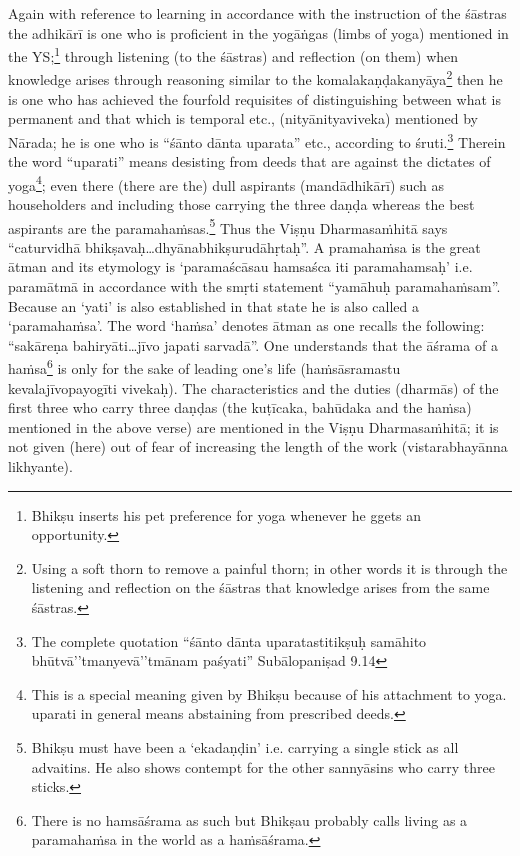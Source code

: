 Again with reference to learning in accordance with the instruction of the śāstras the adhikārī is one who is proficient in the yogāṅgas (limbs of yoga) mentioned in the YS;\footnote{Bhikṣu inserts his pet preference for yoga whenever he ggets an opportunity.} through listening (to the śāstras) and reflection (on them) when knowledge arises through reasoning similar to the komalakaṇḍakanyāya\footnote{Using a soft thorn to remove a painful thorn; in other words it is through the listening and reflection on the śāstras that knowledge arises from the same śāstras.} then he is one who has achieved the fourfold requisites of distinguishing between what is permanent and that which is temporal etc., (nityānityaviveka) mentioned by Nārada; he is one who is “śānto dānta uparata” etc., according to śruti.\footnote{The complete quotation “śānto dānta uparatastitikṣuḥ samāhito bhūtvā’’tmanyevā’’tmānam paśyati” Subālopaniṣad 9.14}  Therein the word “uparati” means desisting from deeds that are against the dictates of yoga\footnote{This is a special meaning given by Bhikṣu because of his attachment to yoga. uparati in general means abstaining from prescribed deeds.}; even there (there are the) dull aspirants (mandādhikārī) such as householders and including those carrying the three daṇḍa whereas the best aspirants are the paramahaṁsas.\footnote{Bhikṣu must have been a ‘ekadaṇḍin’ i.e. carrying a single stick as all advaitins. He also shows contempt for the other sannyāsins who carry three sticks.} Thus the Viṣṇu Dharmasaṁhitā says “caturvidhā bhikṣavaḥ…dhyānabhikṣurudāhṛtaḥ”.  A pramahaṁsa is the great ātman and its etymology is ‘paramaścāsau hamsaśca iti paramahamsaḥ’ i.e. paramātmā in accordance with the smṛti statement “yamāhuḥ paramahaṁsam”. Because an ‘yati’ is also established in that state he is also called a ‘paramahaṁsa’. The word ‘haṁsa’ denotes ātman as one recalls the following: “sakāreṇa bahiryāti…jīvo japati sarvadā”. One understands that the āśrama of a haṁsa\footnote{There is no hamsāśrama as such but Bhikṣau probably calls living as a paramahaṁsa in the world as a
haṁsāśrama.} is only for the sake of leading one’s life (haṁsāsramastu kevalajīvopayogīti vivekaḥ). The characteristics and the duties (dharmās) of the first three who carry three daṇḍas (the kuṭīcaka, bahūdaka and the haṁsa) mentioned in the above verse) are mentioned in the Viṣṇu Dharmasaṁhitā; it is not given (here) out of fear of increasing   the length of the work (vistarabhayānna likhyante). 

